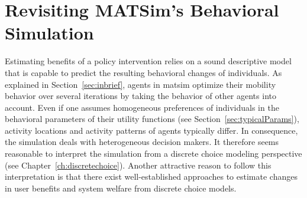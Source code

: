 \section{Revisiting MATSim's Behavioral Simulation}
\label{ch:economicEval:describingBehavior}
%
%
Estimating benefits of a policy intervention relies on a sound descriptive model that is capable to predict the resulting behavioral changes of individuals.
%
%
As explained in Section~\ref{sec:inbrief}, agents in \gls{matsim} optimize their mobility behavior over several iterations by taking the behavior of other agents into account. Even if one assumes homogeneous preferences of individuals in the behavioral parameters of their utility functions (see Section~\ref{sec:typicalParams}), activity locations and activity patterns of agents typically differ. In consequence, the simulation deals with heterogeneous decision makers. It therefore seems reasonable to interpret the simulation from a discrete choice modeling perspective (see Chapter~\ref{ch:discretechoice}). Another attractive reason to follow this interpretation 
is that there exist well-established approaches to estimate changes in user benefits and system welfare from discrete choice models.

